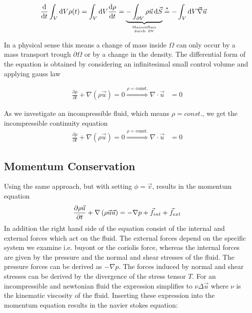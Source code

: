 \begin{align}
    \frac{\dif}{\dif t} \int_{V}\dif V \rho(t) =  \int_{V}\dif V \frac{\dif \rho}{\dif t}  &= \underbrace{-\int_{\partial V}
     \rho \vec{u}\dif \vec{S}}_{\mathrm{Massenfluss} \atop \mathrm{durch \ } \partial V} \overset{*}{=} -\int_V \dif V \vec{\nabla}\vec{u}
\end{align}

In a physical sense this means a change of mass inside $\Omega$ can only occur by a mass transport trough $\partial \Omega$ or by a change in the density.
The differential form of the equation is obtained by considering an infinitesimal small control volume and applying gauss law

\begin{align}
     \frac{\partial \rho}{\partial t}  + \nabla(\rho \vec{u}) = 0 \overset{\rho = \mathrm{const.}}{\Rightarrow} \nabla \cdot \vec{u} &= 0
\end{align}

As we investigate an incompressible fluid, which means $\rho = const.$, we get the incompressible continuity equation
\begin{align}
     \frac{\partial \rho}{\partial t}  + \nabla(\rho \vec{u}) = 0 \overset{\rho = \mathrm{const.}}{\Rightarrow} \nabla \cdot \vec{u} &= 0
\end{align}


\subsection{Momentum Conservation}

Using the same approach, but with setting $\phi = \vec{v}$, results in the momentum equation
\begin{align}
    \pdn[\rho \vec{u}]{t} + \nabla\left(\rho\vec{u}\vec{u}\right) =  -\nabla p  + \vec{f}_{int} + \vec{f}_{ext}
\end{align}
In addition the right hand side of the equation consist of the internal and external forces which act on the fluid.
The external forces depend on the specific system  we examine i.e. buyont or the coriolis force, whereas the internal forces
are given by the pressure and the normal and shear stresses of the fluid.
The pressure forces can be derived as $- \nabla p$.
The forces induced by normal and shear stresses can be derived by the divergence of the stress tensor $T$.
For an incompressible and newtonian fluid the expression simplifies to $\nu \Delta \vec{u}$ where $\nu$ is the kinematic viscosity of the fluid.
Inserting these expression into the momentum equation results in the navier stokes equation:

